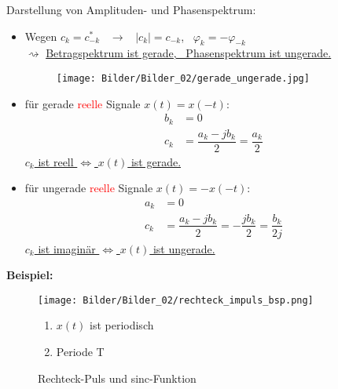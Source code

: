 Darstellung von Amplituden- und Phasenspektrum:
\begin{itemize}
    \item
    Wegen $c_k=c_{-k}^{*}$ \, $\rightarrow$ \, $|c_k|=c_{-k}$, \, $\varphi_k=-\varphi_{-k}$\\
    $\rightsquigarrow$ \uline{Betragspektrum ist gerade, \, Phasenspektrum ist ungerade.}
    \begin{figure}[H]
        \centering
        \texttt{[image: Bilder/Bilder\_02/gerade\_ungerade.jpg]}
        \nonumber
    \end{figure}
    \item
    für gerade \textcolor{red}{reelle} Signale $x(t)=x(-t)$:
    \begin{equation}
        \begin{aligned}
            b_k&=0\\
            c_k&=\dfrac{a_k-jb_k}{2}=\dfrac{a_k}{2}
        \end{aligned}
    \end{equation}
    \uline{$c_k$ ist reell $\Longleftrightarrow$ $x(t)$ ist gerade.}
    \item
    für ungerade \textcolor{red}{reelle} Signale $x(t)=-x(-t)$:
    \begin{equation}
        \begin{aligned}
            a_k&=0\\
            c_k&=\dfrac{a_k-jb_k}{2}=-\dfrac{j b_k}{2}=\dfrac{b_k}{2j}
        \end{aligned}
    \end{equation}
    \uline{$c_k$ ist imaginär $\Longleftrightarrow$ $x(t)$ ist ungerade.}
\end{itemize}

\textbf{Beispiel:}
\begin{figure}[H]
    \centering
        \begin{minipage}{.45\textwidth}
            \centering
            \texttt{[image: Bilder/Bilder\_02/rechteck\_impuls\_bsp.png]}
            \caption{Rechteck-Puls und sinc-Funktion}
            \label{fig: symmetrie}
        \end{minipage}
        \hspace{1cm}
        \begin{minipage}{.45\textwidth}
            \begin{enumerate}
                \item 
                $x(t)$ ist periodisch
                \item
                Periode T
            \end{enumerate}
        \end{minipage}
\end{figure}

